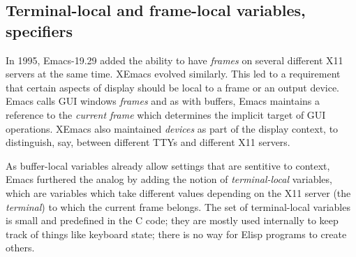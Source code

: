 \documentclass[format=acmsmall, review=false, screen=true]{acmart}
\newcommand \Elisp {Elisp}
\begin{document}







\subsection{Terminal-local and frame-local variables, specifiers}

In 1995, Emacs-19.29 added the ability to have \emph{frames} on
several different X11 servers at the same time.  XEmacs evolved
similarly.  This led to a requirement that certain aspects of display
should be local to a frame or an output device.  Emacs calls GUI
windows \emph{frames} and as with buffers, Emacs maintains a reference
to the \emph{current frame} which determines the implicit target of
GUI operations.  XEmacs also maintained \textit{devices} as part of
the display context, to distinguish, say, between different TTYs and
different X11 servers.

As buffer-local variables already allow settings that are sentitive to
context, Emacs furthered the analog by adding the notion of
\emph{terminal-local} variables, which are variables which take
different values depending on the X11 server (the \emph{terminal}) to
which the current frame belongs.  The set of terminal-local variables
is small and predefined in the C code; they are mostly used internally
to keep track of things like keyboard state; there is no way for
\Elisp{} programs to create others.
\end{document}

